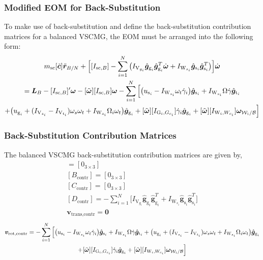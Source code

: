 \subsubsection{Modified EOM for Back-Substitution}
To make use of back-substitution and define the back-substitution contribution matrices for a balanced VSCMG, the EOM must be arranged into the following form:
\begin{multline}
m_{\text{\text{sc}}}[\tilde{\bm{c}}]\ddot{\bm r}_{B/N} + \Big[ [I_{\text{sc},B}] - \sum\limits_{i=1}^{N}\big(I_{\text{V}_{g_i}}\hat{\bm{g}}_{\text{g}_i}\hat{\bm g}_{\text{g}_i}^T\dot{\bm{\omega}} + I_{\text{W}_{s_i}}\hat{\bm{g}}_{\text{s}_i}\hat{\bm g}_{\text{s}_i}^T\big)\Big]\dot{\bm\omega}
\\
= \bm{L}_B - [I_{\text{sc},B}]'\bm{\omega} - [\tilde{\bm\omega}][I_{\text{sc},B}]\bm\omega
-\sum\limits_{i=1}^{N} \Big[ 
\big( u_{\text{s}_i}-I_{\text{W}_{s_i}}\omega_t\dot{\gamma}_i \big) \hat{\bm{g}}_{\text{s}_i} + I_{\text{W}_{s_i}}\Omega\dot{\gamma}\hat{\bm{g}}_{\text{t}_i} \\+\big( u_{\text{g}_i} + (I_{\text{V}_{s_i}}-I_{\text{V}_{t_i}})\omega_s\omega_t + I_{\text{W}_{s_i}}\Omega_i\omega_t\big)\hat{\bm{g}}_{\text{g}_i}+ [\tilde{\bm\omega}][I_{\text{G}_i,G_{c_i}}]\dot{\gamma}_i\hat{\bm{g}}_{\text{g}_i} + [\tilde{\bm{\omega}}][I_{\text{W}_i,W_{c_i}}]\bm{\omega}_{\mathcal{W}_i/\cal B}
\Big]
\label{eq:vscmgRotationSimpleBS2_BACKSUBAPP}
\end{multline}

\subsubsection{Back-Substitution Contribution Matrices}
The balanced VSCMG back-substitution contribution matrices are given by,
\begin{gather}
[A_\text{contr}] = [0_{3 \times 3}]
\\
[B_\text{contr}] = [0_{3 \times 3}]
\\
[C_\text{contr}] = [0_{3 \times 3}]
\\
[D_\text{contr}] = - \sum\limits_{i=1}^{N}\big[I_{\text{V}_{g_i}}\hat{\bm{g}}_{\text{g}_i}\hat{\bm g}_{\text{g}_i}^T + I_{\text{W}_{s_i}}\hat{\bm{g}}_{\text{s}_i}\hat{\bm g}_{\text{s}_i}^T\big]
\\
\bm v_{\text{trans,contr}} = \bm 0
\end{gather}
\begin{multline}
\bm v_{\text{rot,contr}} =  -\sum\limits_{i=1}^{N} \Big[ 
\big( u_{\text{s}_i}-I_{\text{W}_{s_i}}\omega_t\dot{\gamma}_i \big) \hat{\bm{g}}_{\text{s}_i} + I_{\text{W}_{s_i}}\Omega\dot{\gamma}\hat{\bm{g}}_{\text{t}_i} +\big( u_{\text{g}_i} + (I_{\text{V}_{s_i}}-I_{\text{V}_{t_i}})\omega_s\omega_t + I_{\text{W}_{s_i}}\Omega_i\omega_t\big)\hat{\bm{g}}_{\text{g}_i}\\+ [\tilde{\bm\omega}][I_{\text{G}_i,G_{c_i}}]\dot{\gamma}_i\hat{\bm{g}}_{\text{g}_i} + [\tilde{\bm{\omega}}][I_{\text{W}_i,W_{c_i}}]\bm{\omega}_{\mathcal{W}_i/\cal B}
\Big]
\end{multline}

